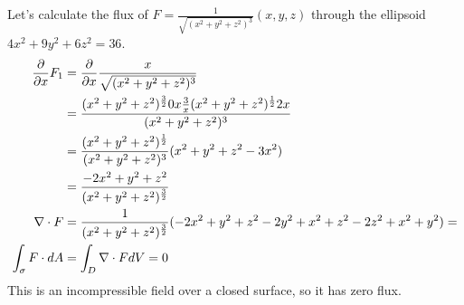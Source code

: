 \documentclass[fleqn,letterpaper]{report}
\begin{document}
\begin{example}
Let's calculate the flux of $F =
\frac{1}{\sqrt{(x^2+y^2+z^2)^3}} (x,y,z)$ through the
ellipsoid $4x^2 + 9y^2 + 6z^2 = 36$. 
\begin{align*}
\frac{\partial}{\partial x} F_1 & = \frac{\partial}{\partial x}
\frac{x}{\sqrt{(x^2+y^2+z^2)^3}} \\
& = \frac{(x^2+y^2+z^2)^\frac{3}{2} 0 x \frac{3}{x}
(x^2+y^2+z^2)^{\frac{1}{2}} 2x}{(x^2+y^2+z^2)^3} \\
& = \frac{(x^2+y^2+z^2)^\frac{1}{2}}{(x^2+y^2+z^2)^3}
(x^2+y^2+z^2 - 3x^2) \\
& = \frac{-2x^2 + y^2 + z^2}{(x^2+y^2+z^2)^\frac{3}{2}} \\
\nabla \cdot F & = \frac{1}{(x^2+y^2+z^2)^\frac{3}{2}} (-2x^2
+ y^2 +z^2 - 2y^2 + x^2 +z^2 - 2z^2 + x^2 + y^2) = \\
\int_\sigma F \cdot dA & = \int_D \nabla \cdot F dV = 0
\end{align*}
This is an incompressible field over a closed surface, so it
has zero flux.
\end{example}
\end{document}
